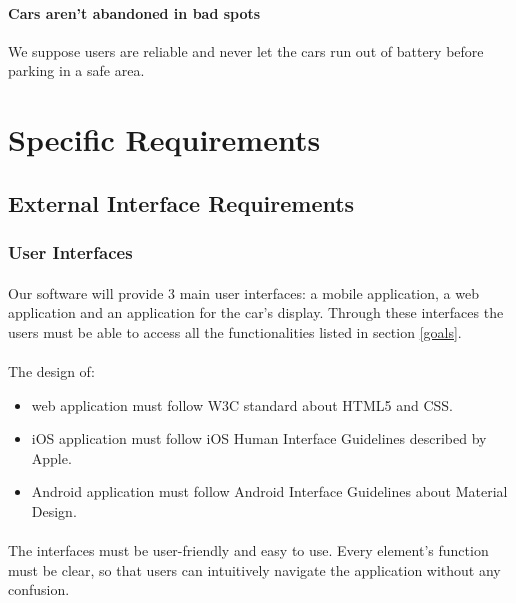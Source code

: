 \documentclass[english]{article}
\begin{document}
\paragraph{Cars aren't abandoned in bad spots}
We suppose users are reliable and never let the cars run out of battery before parking in a safe area.

\newpage

\section{Specific Requirements}

\subsection{External Interface Requirements}

\subsubsection{User Interfaces}

\paragraph{}
Our software will provide 3 main user interfaces: a mobile application, a web application and an application for the car's display.
Through these interfaces the users must be able to access all the functionalities listed in section \ref{goals}.

\paragraph{}
The design of:
\begin{itemize}
  \item{web application must follow W3C standard about HTML5 and CSS.}
  \item{iOS application must follow iOS Human Interface Guidelines described by Apple.}
  \item{Android application must follow Android Interface Guidelines about Material Design.}
\end{itemize}

\paragraph{}
The interfaces must be user-friendly and easy to use.
Every element's function must be clear, so that users can intuitively navigate the application without any confusion.
\end{document}
